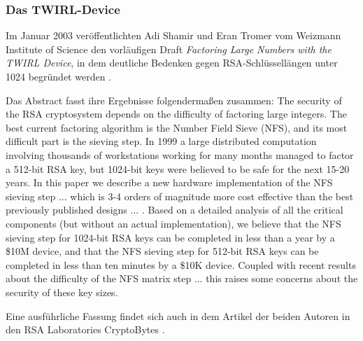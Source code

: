 \begin{refsegment}
\subsubsection{Das TWIRL-Device} \label{TWIRLDevice} 

Im Januar 2003 veröffentlichten Adi Shamir und Eran Tromer vom Weizmann
Institute of Science den vorläufigen Draft {\em \glqq Factoring Large Numbers
with the TWIRL Device\grqq}, in dem deutliche Bedenken gegen RSA-Schlüssellängen
unter 1024 begründet werden \cite{Shamir2003}.

Das Abstract fasst ihre Ergebnisse folgendermaßen zusammen: \glqq The security of the RSA cryptosystem depends on the difficulty of factoring large integers. The best current factoring algorithm is the Number Field Sieve (NFS), and its most difficult part is the sieving step. In 1999 a large distributed computation involving thousands of workstations working for many months managed to factor a 512-bit RSA key, but 1024-bit keys were believed to be safe for the next 15-20 years. In this paper we describe a new hardware implementation of the NFS sieving step ... which is 3-4 orders of magnitude more cost effective than the best previously published designs ... . Based on a detailed analysis of all the critical components (but without an actual implementation), we believe that the NFS sieving step for 1024-bit RSA keys can be completed in less than a year by a \$10M device, and that the NFS sieving step for 512-bit RSA keys can be completed in less than ten minutes by a \$10K device. Coupled with recent results about the difficulty of the NFS matrix step ... this raises some concerns about the security of these key sizes.\grqq

Eine ausführliche Fassung findet sich auch in dem Artikel der beiden Autoren
in den RSA Laboratories CryptoBytes \cite{Shamir2003a}.


\end{refsegment}
